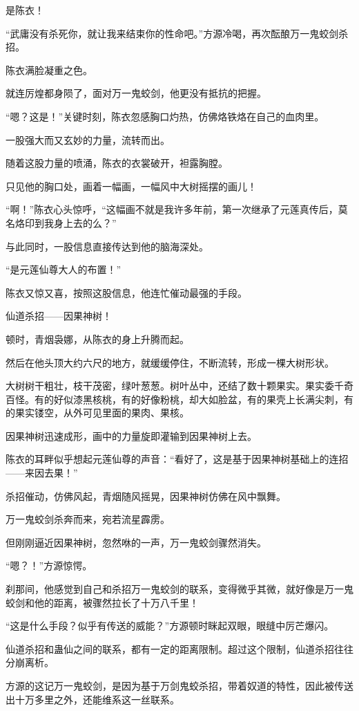 \begin{this_body}
是陈衣！

“武庸没有杀死你，就让我来结束你的性命吧。”方源冷喝，再次酝酿万一鬼蛟剑杀招。

陈衣满脸凝重之色。

就连厉煌都身陨了，面对万一鬼蛟剑，他更没有抵抗的把握。

“嗯？这是！”关键时刻，陈衣忽感胸口灼热，仿佛烙铁烙在自己的血肉里。

一股强大而又玄妙的力量，流转而出。

随着这股力量的喷涌，陈衣的衣裳破开，袒露胸膛。

只见他的胸口处，画着一幅画，一幅风中大树摇摆的画儿！

“啊！”陈衣心头惊呼，“这幅画不就是我许多年前，第一次继承了元莲真传后，莫名烙印到我身上去的么？”

与此同时，一股信息直接传达到他的脑海深处。

“是元莲仙尊大人的布置！”

陈衣又惊又喜，按照这股信息，他连忙催动最强的手段。

仙道杀招——因果神树！

顿时，青烟袅娜，从陈衣的身上升腾而起。

然后在他头顶大约六尺的地方，就缓缓停住，不断流转，形成一棵大树形状。

大树树干粗壮，枝干茂密，绿叶葱葱。树叶丛中，还结了数十颗果实。果实委千奇百怪。有的好似漆黑核桃，有的好像粉桃，却大如脸盆，有的果壳上长满尖刺，有的果实镂空，从外可见里面的果肉、果核。

因果神树迅速成形，画中的力量旋即灌输到因果神树上去。

陈衣的耳畔似乎想起元莲仙尊的声音：“看好了，这是基于因果神树基础上的连招——来因去果！”

杀招催动，仿佛风起，青烟随风摇晃，因果神树仿佛在风中飘舞。

万一鬼蛟剑杀奔而来，宛若流星霹雳。

但刚刚逼近因果神树，忽然咻的一声，万一鬼蛟剑骤然消失。

“嗯？！”方源惊愕。

刹那间，他感觉到自己和杀招万一鬼蛟剑的联系，变得微乎其微，就好像是万一鬼蛟剑和他的距离，被骤然拉长了十万八千里！

“这是什么手段？似乎有传送的威能？”方源顿时眯起双眼，眼缝中厉芒爆闪。

仙道杀招和蛊仙之间的联系，都有一定的距离限制。超过这个限制，仙道杀招往往分崩离析。

方源的这记万一鬼蛟剑，是因为基于万剑鬼蛟杀招，带着奴道的特性，因此被传送出十万多里之外，还能维系这一丝联系。


\end{this_body}
